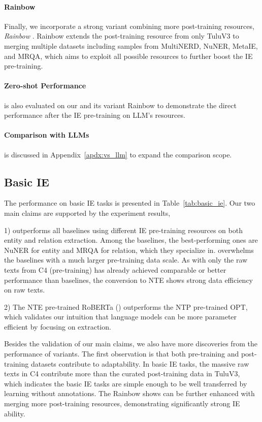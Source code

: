\paragraph{Rainbow \our} Finally, we incorporate a strong variant combining more post-training resources, \emph{Rainbow \our}. Rainbow \our extends the post-training resource from only TuluV3 to merging multiple datasets including samples from MultiNERD, NuNER, MetaIE, and MRQA, which aims to exploit all possible resources to further boost the IE pre-training.

\paragraph{Zero-shot Performance} is also evaluated on our \our and its variant Rainbow \our to demonstrate the direct performance after the IE pre-training on LLM's resources.

\paragraph{Comparison with LLMs} is discussed in Appendix~\ref{apdx:vs_llm} to expand the comparison scope.

\subsection{Basic IE}

The performance on basic IE tasks is presented in Table~\ref{tab:basic_ie}. Our two main claims are supported by the experiment results,

1) \our outperforms all baselines using different IE pre-training resources on both entity and relation extraction. Among the baselines, the best-performing ones are NuNER for entity and MRQA for relation, which they specialize in. \our overwhelms the baselines with a much larger pre-training data scale. As \our with only the raw texts from C4 (pre-training) has already achieved comparable or better performance than baselines, the conversion to NTE shows strong data efficiency on raw texts. 

2) The NTE pre-trained RoBERTa (\our) outperforms the NTP pre-trained OPT, which validates our intuition that language models can be more parameter efficient by focusing on extraction.

Besides the validation of our main claims, we also have more discoveries from the performance of variants. The first observation is that both pre-training and post-training datasets contribute to adaptability. In basic IE tasks, the massive raw texts in C4 contribute more than the curated post-training data in TuluV3, which indicates the basic IE tasks are simple enough to be well transferred by learning without annotations. The Rainbow \our shows \our can be further enhanced with merging more post-training resources, demonstrating significantly strong IE ability. 

